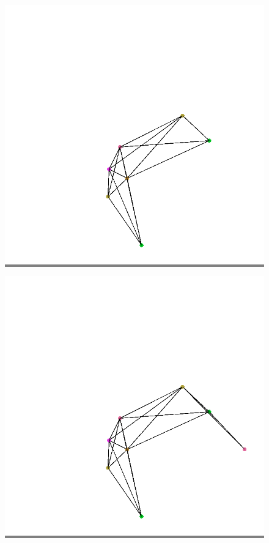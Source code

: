 \documentclass{article}
\begin{document}
\begin{figure}
\begin{minipage}{0.2\textwidth}
            \end{minipage}
            \hspace{\fill}
            \begin{minipage}{0.2\textwidth}
            \colorbox{gray}{\includegraphics[width=\linewidth]{./images/color-7.png}}
            \end{minipage}
            \hspace{\fill}
            \begin{minipage}{0.2\textwidth}
            \colorbox{gray}{\includegraphics[width=\linewidth]{./images/color-8.png}}

\end{minipage}
\end{figure}
\end{document}
